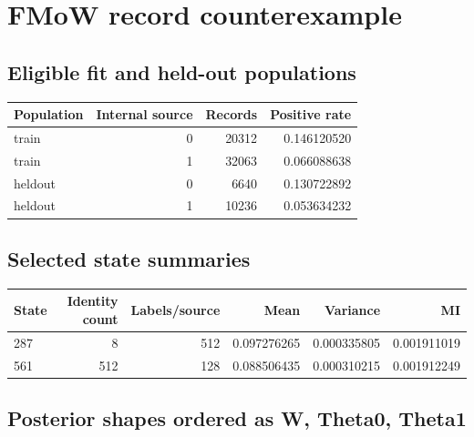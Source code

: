 \reservetable
\section{FMoW record counterexample}

\reservetable
\subsection{Eligible fit and held-out populations}

\begingroup\small
\setlength{\tabcolsep}{4pt}
\begin{longtable}{lrrr}
\toprule

Population & Internal source & Records & Positive rate\\\midrule\endhead

train & 0 & 20312 & 0.146120520\\

train & 1 & 32063 & 0.066088638\\

heldout & 0 & 6640 & 0.130722892\\

heldout & 1 & 10236 & 0.053634232\\

\bottomrule
\end{longtable}
\endgroup

\reservetable
\subsection{Selected state summaries}

\begingroup\small
\setlength{\tabcolsep}{4pt}
\begin{longtable}{lrrrrr}
\toprule

State & Identity count & Labels/source & Mean & Variance & MI\\\midrule\endhead

287 & 8 & 512 & 0.097276265 & 0.000335805 & 0.001911019\\

561 & 512 & 128 & 0.088506435 & 0.000310215 & 0.001912249\\

\bottomrule
\end{longtable}
\endgroup

\reservetable
\subsection{Posterior shapes ordered as W, Theta0, Theta1}


